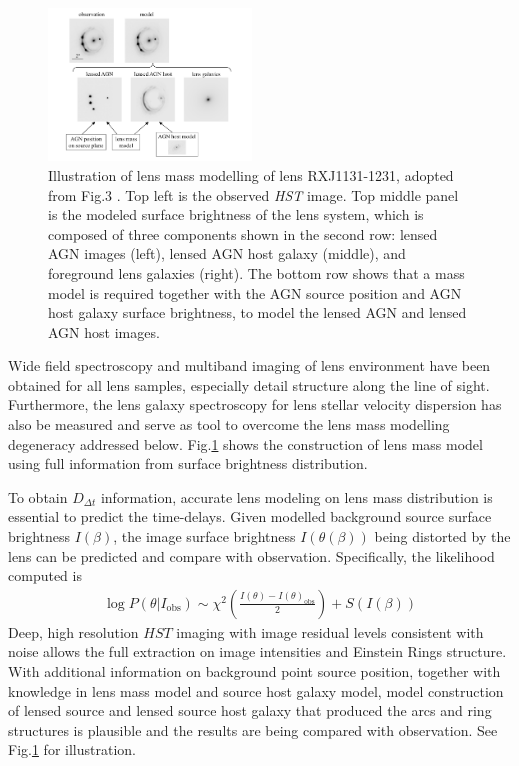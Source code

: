 \documentclass{cosmo}
\begin{document}
    \begin{figure}[h]
        \centering
        \includegraphics[width=0.48\textwidth]{fig3_2.png}
        \caption{Illustration of lens mass modelling of lens RXJ1131-1231, adopted from Fig.3  \cite{Suyu2018}. Top left is the observed \textit{HST} image. Top middle panel is the modeled surface brightness of the lens system, which is composed of three components shown in the second row: lensed AGN images (left), lensed AGN host galaxy (middle), and foreground lens galaxies (right). The bottom row shows that a mass model is required together with the AGN source position and AGN host galaxy surface brightness, to model the lensed AGN and lensed AGN host images.}
        \label{fig3}
    \end{figure}
    
    Wide field spectroscopy and multiband imaging of lens environment have been obtained for all lens samples, especially detail structure along the line of sight. Furthermore, the lens galaxy spectroscopy for lens stellar velocity dispersion has also be measured and serve as tool to overcome the lens mass modelling degeneracy addressed below. Fig.\ref{fig3} shows the construction of lens mass model using full information from surface brightness distribution.
    
    To obtain $D_{\Delta t}$ information, accurate lens modeling on lens mass distribution is essential to predict the time-delays. Given modelled background source surface brightness $I(\beta)$, the image surface brightness $I(\theta(\beta))$ being distorted by the lens can be predicted and compare with observation. Specifically, the likelihood computed is 
    \begin{align*}
        \log P(\theta|I_\mathrm{obs}) \sim \chi^2 \left( \frac{I(\theta)-I(\theta)_{\mathrm{obs}}}{2}\right) + S(I(\beta)) 
    \end{align*}
    Deep, high resolution $\textit{HST}$ imaging with image residual levels consistent with noise allows the full extraction on image intensities and Einstein Rings structure. With additional information on background point source position, together with knowledge in lens mass model and source host galaxy model, model construction of lensed source and lensed source host galaxy that produced the arcs and ring structures is plausible and the results are being compared with observation. See Fig.\ref{fig3} for illustration.
    
\end{document}
